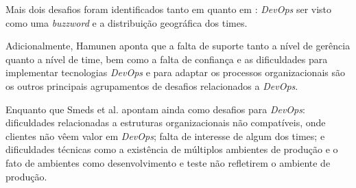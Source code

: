 Mais dois desafios foram identificados tanto em \cite{devops_a_definition} quanto em \cite{challenges_in_adopting_devops}:
{\it DevOps} ser visto como uma \textit{buzzword} e a distribuição geográfica
dos times.

Adicionalmente, Hamunen \cite{challenges_in_adopting_devops} aponta que a falta
de suporte tanto a nível de gerência quanto a nível de time, bem como a falta
de confiança e as dificuldades para implementar tecnologias {\it DevOps} e para
adaptar os processos organizacionais são os outros principais agrupamentos de
desafios relacionados a {\it DevOps}.

Enquanto que Smeds et al. \cite{devops_a_definition} apontam ainda como desafios para {\it DevOps}:
dificuldades relacionadas a estruturas organizacionais não compatíveis, onde
clientes não vêem valor em {\it DevOps}; falta de interesse de algum dos times;
e dificuldades técnicas como a existência de múltiplos ambientes de produção e
o fato de ambientes como desenvolvimento e teste não refletirem o ambiente de
produção.
